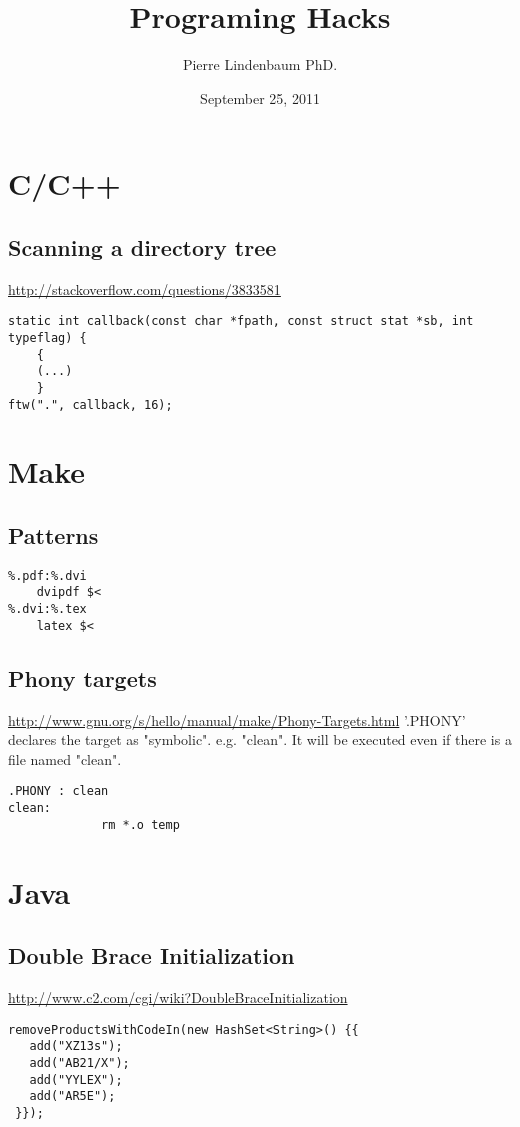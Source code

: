 \documentclass[12pt]{article}
\title{Programing Hacks}
\author{Pierre Lindenbaum PhD.}
\date{September 25, 2011}
\begin{document}
\maketitle
\section{C/C++}
\subsection{Scanning a directory tree}
\url{http://stackoverflow.com/questions/3833581}
\begin{verbatim}
static int callback(const char *fpath, const struct stat *sb, int typeflag) {
	{
	(...)
	}
ftw(".", callback, 16);
\end{verbatim}

\section{Make}
\subsection{Patterns}
\begin{verbatim}
%.pdf:%.dvi
	dvipdf $<
%.dvi:%.tex
	latex $<
\end{verbatim}
\subsection{Phony targets}
\url{http://www.gnu.org/s/hello/manual/make/Phony-Targets.html}
'.PHONY' declares the target as "symbolic". e.g. "clean". It will be executed even if there is a file named "clean".
\begin{verbatim}
.PHONY : clean
clean:
             rm *.o temp
\end{verbatim}

\section{Java}
\subsection{Double Brace Initialization}
\url{http://www.c2.com/cgi/wiki?DoubleBraceInitialization}
\begin{verbatim}
removeProductsWithCodeIn(new HashSet<String>() {{
   add("XZ13s");
   add("AB21/X");
   add("YYLEX");
   add("AR5E");
 }});
\end{verbatim}
\end{document}
